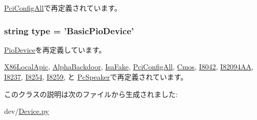 \hyperlink{classPci_1_1PciConfigAll_aa933b0c4a9c52039f5a3f5a97a97fc9f}{PciConfigAll}で再定義されています。\hypertarget{classDevice_1_1BasicPioDevice_acce15679d830831b0bbe8ebc2a60b2ca}{
\subsubsection[{type}]{\setlength{\rightskip}{0pt plus 5cm}string {\bf type} = '{\bf BasicPioDevice}'}}
\label{classDevice_1_1BasicPioDevice_acce15679d830831b0bbe8ebc2a60b2ca}


\hyperlink{classDevice_1_1PioDevice_acce15679d830831b0bbe8ebc2a60b2ca}{PioDevice}を再定義しています。

\hyperlink{classX86LocalApic_1_1X86LocalApic_acce15679d830831b0bbe8ebc2a60b2ca}{X86LocalApic}, \hyperlink{classAlphaBackdoor_1_1AlphaBackdoor_acce15679d830831b0bbe8ebc2a60b2ca}{AlphaBackdoor}, \hyperlink{classDevice_1_1IsaFake_acce15679d830831b0bbe8ebc2a60b2ca}{IsaFake}, \hyperlink{classPci_1_1PciConfigAll_acce15679d830831b0bbe8ebc2a60b2ca}{PciConfigAll}, \hyperlink{classCmos_1_1Cmos_acce15679d830831b0bbe8ebc2a60b2ca}{Cmos}, \hyperlink{classI8042_1_1I8042_acce15679d830831b0bbe8ebc2a60b2ca}{I8042}, \hyperlink{classI82094AA_1_1I82094AA_acce15679d830831b0bbe8ebc2a60b2ca}{I82094AA}, \hyperlink{classI8237_1_1I8237_acce15679d830831b0bbe8ebc2a60b2ca}{I8237}, \hyperlink{classI8254_1_1I8254_acce15679d830831b0bbe8ebc2a60b2ca}{I8254}, \hyperlink{classI8259_1_1I8259_acce15679d830831b0bbe8ebc2a60b2ca}{I8259}, と \hyperlink{classPcSpeaker_1_1PcSpeaker_acce15679d830831b0bbe8ebc2a60b2ca}{PcSpeaker}で再定義されています。

このクラスの説明は次のファイルから生成されました:\begin{DoxyCompactItemize}
\item 
dev/\hyperlink{Device_8py}{Device.py}\end{DoxyCompactItemize}
